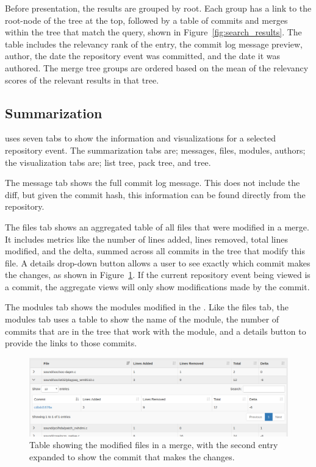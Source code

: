 Before presentation, the results are grouped by \mt root. Each group
has a link to the root-node of the tree at the top, followed by a table
of commits and merges within the tree that match the query, shown in
Figure~\ref{fig:search_results}. The table includes the relevancy rank
of the entry, the commit log message preview, author, the date the
repository event was committed, and the date it was authored. The merge
tree groups are ordered based on the mean of the relevancy scores of the
relevant results in that tree.

\subsection{Summarization}
\label{sub:summarization}

\tool uses seven tabs to show the information and visualizations for a
selected repository event. The summarization tabs are; messages, files, modules,
authors; the visualization tabs are; list tree, pack tree, and \rt tree.

The message tab shows the full commit log message. This does not include
the diff, but given the commit hash, this information can be found
directly from the repository.

The files tab shows an aggregated table of all files that were modified
in a merge. It includes metrics like the number of lines added, lines
removed, total lines modified, and the delta, summed across all commits
in the \mt tree that modify this file. A details drop-down button
allows a user to see exactly which commit makes the changes, as shown in
Figure~\ref{fig:linvis_files}. If the current repository event being
viewed is a commit, the aggregate views will only show modifications
made by the commit.

The modules tab shows the modules modified in the \mt. Like the
files tab, the modules tab uses a table to show the name of the module,
the number of commits that are in the \mt tree that work with the
module, and a details button to provide the links to those commits.

\begin{figure}[htpb]
  \centering
  \includegraphics[width=\figwidth]{figures/linvis/linvis_files.png}
  \caption{Table showing the modified files in a merge, with the second
  entry expanded to show the commit that makes the changes.}
  \label{fig:linvis_files}
\end{figure}

